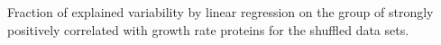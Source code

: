 \label{fig:shuffledexpvar}
Fraction of explained variability by linear regression on the group of strongly positively correlated with growth rate proteins for the shuffled data sets.
